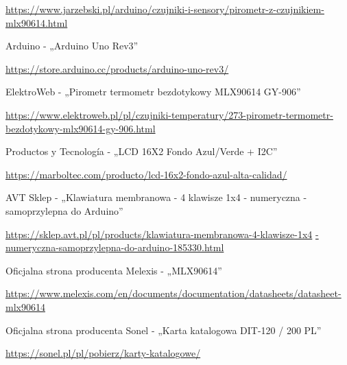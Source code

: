 \begin{thebibliography}{999}
\begin{spacing}{0.8}
    \url{https://www.jarzebski.pl/arduino/czujniki-i-sensory/pirometr-z-czujnikiem-mlx90614.html}

     Arduino - „Arduino Uno Rev3”

    \url{https://store.arduino.cc/products/arduino-uno-rev3/}

      ElektroWeb - „Pirometr termometr bezdotykowy MLX90614 GY-906”
    
    \url{https://www.elektroweb.pl/pl/czujniki-temperatury/273-pirometr-termometr-bezdotykowy-mlx90614-gy-906.html}

     Productos y Tecnología - „LCD 16X2 Fondo Azul/Verde + I2C”
    
    \url{https://marboltec.com/producto/lcd-16x2-fondo-azul-alta-calidad/}


     AVT Sklep - „Klawiatura membranowa - 4 klawisze 1x4 - numeryczna - samoprzylepna do Arduino”
    
    \url{https://sklep.avt.pl/pl/products/klawiatura-membranowa-4-klawisze-1x4}
    \url{-numeryczna-samoprzylepna-do-arduino-185330.html}

     Oficjalna strona producenta Melexis - „MLX90614”
    
    \url{https://www.melexis.com/en/documents/documentation/datasheets/datasheet-mlx90614}

     Oficjalna strona producenta Sonel - „Karta katalogowa DIT-120 / 200 PL”
    
    \url{https://sonel.pl/pl/pobierz/karty-katalogowe/}

\end{spacing}
\end{thebibliography}
